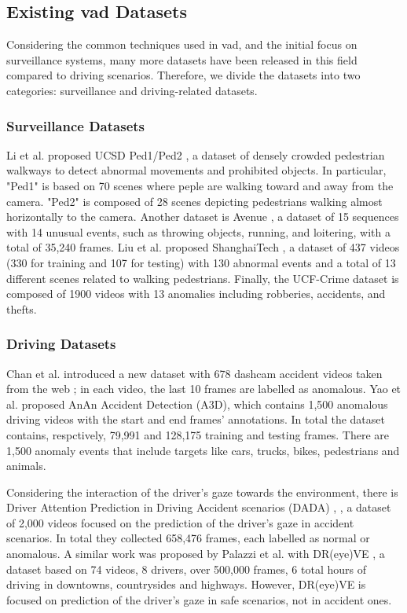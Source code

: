 \subsection{Existing \ac{vad} Datasets}
Considering the common techniques used in \ac{vad}, and the initial focus 
on surveillance systems, many more datasets have been released in this field 
compared to driving scenarios. Therefore, we divide the datasets into 
two categories: surveillance and driving-related datasets.

\subsubsection{Surveillance Datasets}
Li et al. proposed UCSD Ped1/Ped2 \cite{ucsd}, 
a dataset of densely 
crowded pedestrian walkways to detect abnormal movements and prohibited objects.
In particular, "Ped1" is based on 70 scenes where peple are walking toward and 
away from the camera.
"Ped2" is composed of 28 scenes depicting pedestrians walking almost 
horizontally to the camera.
Another dataset is Avenue \cite{avenue}, a dataset of 15 sequences with 14 
unusual events, such as throwing objects, running, and loitering, with a total 
of 35,240 frames.
Liu et al. proposed ShanghaiTech \cite{shanghaitech_dataset}, a dataset of 437 
videos (330 
for training and 107 for testing) with 130 abnormal events and a total of 
13 different scenes related to walking pedestrians.
Finally, the UCF-Crime dataset \cite{ucf_crime} is composed of 1900 videos 
with 13 anomalies including robberies, accidents, and thefts.

\subsubsection{Driving Datasets}
Chan et al. introduced a new dataset with 678 dashcam accident videos taken from 
the web \cite{anticip_accident_dashcam}; in each video, the last 10 frames are 
labelled as anomalous.
Yao et al. proposed AnAn Accident Detection (A3D)\cite{a3d}, which contains 1,500
anomalous driving videos with the start and end frames' annotations. In total 
the dataset contains, respctively, 79,991 and 128,175 training and testing frames.
There are 1,500 anomaly events that include targets like cars, trucks, bikes, 
pedestrians and animals.

Considering the interaction of the driver's gaze towards the environment,
there is Driver Attention Prediction in Driving Accident scenarios (DADA) 
\cite{dada1}, \cite{dada2}, a dataset of 2,000 videos focused on the prediction 
of the driver's gaze in accident scenarios. In total they collected 658,476 
frames, each labelled as normal or anomalous. A similar work was proposed 
by Palazzi et al. with DR(eye)VE \cite{dreyeve}, a dataset based on 74 
videos, 8 drivers, over 500,000 frames, 6 total hours of driving in 
downtowns, countrysides and highways. 
However, DR(eye)VE is focused on prediction of the driver's gaze in 
safe scenarios, not in accident ones.

